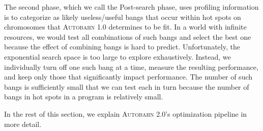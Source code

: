 \documentclass[format=sigplan, review=true, 9pt]{acmart}
\newcommand{\hotspots}[0]{hot spots}
\newcommand{\useful}[0]{useful}
\newcommand{\useless}[0]{useless}
\newcommand{\Ao}[0]{\textsc{Autobahn 1.0}}
\newcommand{\At}[0]{\textsc{Autobahn 2.0}}
\newcommand{\Postopt}[0]{Post-search}
\begin{document}
The second phase, which we call the \Postopt{} phase, uses profiling
information is to categorize as likely \useless{}/\useful{} bangs that occur within \hotspots{} on
chromosomes that \Ao{} determines to be fit.  In a world with infinite resources,
we would test all combinations of such bangs and select the best one
because the effect of combining bangs is hard to predict.
Unfortunately, the exponential search space is too large to explore
exhaustively. Instead, we individually turn off one such bang at a
time, measure the resulting performance, and keep only those that
significantly impact performance.  The number of such bangs is
sufficiently small that we can test each in turn because the number of
bangs in \hotspots{} in a program is relatively small.

In the rest of this section, we explain \At{}'s optimization pipeline
in more detail.
\end{document}
